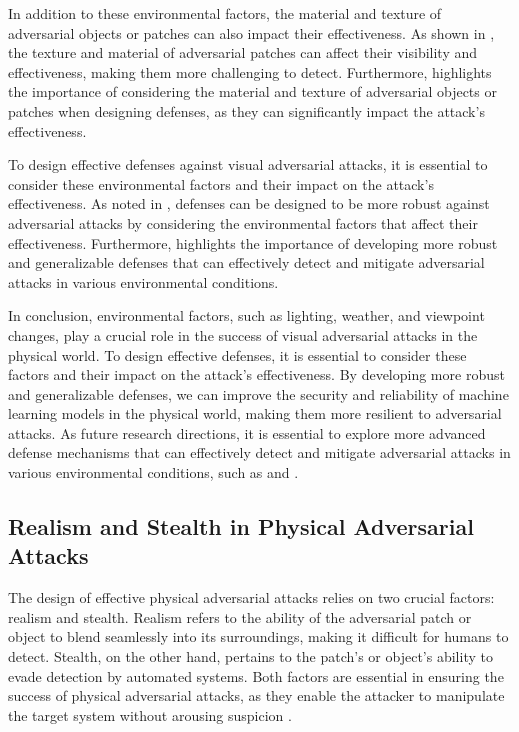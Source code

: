 \documentclass[11pt,a4paper]{article}
\begin{document}
In addition to these environmental factors, the material and texture of adversarial objects or patches can also impact their effectiveness. As shown in \cite{doi:10.1007/978-3-030-58574-7_41}, the texture and material of adversarial patches can affect their visibility and effectiveness, making them more challenging to detect. Furthermore, \cite{doi:10.1007/978-3-030-58589-1_3} highlights the importance of considering the material and texture of adversarial objects or patches when designing defenses, as they can significantly impact the attack's effectiveness.

To design effective defenses against visual adversarial attacks, it is essential to consider these environmental factors and their impact on the attack's effectiveness. As noted in \cite{doi:10.1109/access.2022.3216291}, defenses can be designed to be more robust against adversarial attacks by considering the environmental factors that affect their effectiveness. Furthermore, \cite{doi:10.1007/s11633-019-1211-x} highlights the importance of developing more robust and generalizable defenses that can effectively detect and mitigate adversarial attacks in various environmental conditions.

In conclusion, environmental factors, such as lighting, weather, and viewpoint changes, play a crucial role in the success of visual adversarial attacks in the physical world. To design effective defenses, it is essential to consider these factors and their impact on the attack's effectiveness. By developing more robust and generalizable defenses, we can improve the security and reliability of machine learning models in the physical world, making them more resilient to adversarial attacks. As future research directions, it is essential to explore more advanced defense mechanisms that can effectively detect and mitigate adversarial attacks in various environmental conditions, such as \cite{doi:10.1109/access.2022.3208131} and \cite{doi:10.1109/tnnls.2025.3561225}.


\subsection{Realism and Stealth in Physical Adversarial Attacks}


The design of effective physical adversarial attacks relies on two crucial factors: realism and stealth. Realism refers to the ability of the adversarial patch or object to blend seamlessly into its surroundings, making it difficult for humans to detect. Stealth, on the other hand, pertains to the patch's or object's ability to evade detection by automated systems. Both factors are essential in ensuring the success of physical adversarial attacks, as they enable the attacker to manipulate the target system without arousing suspicion \cite{arxiv:1712.09665}. 
\end{document}
